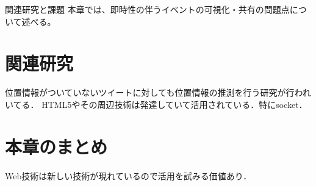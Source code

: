 \chapterhead
{関連研究と課題}
{本章では、即時性の伴うイベントの可視化・共有の問題点について述べる。}

\section{関連研究}
位置情報がついていないツイートに対しても位置情報の推測を行う研究が行われいてる．\cite{inproceedings4}
HTML5やその周辺技術は発達していて活用されている\cite{inproceedings1}．特にsocket\cite{inproceedings3}．

\section{本章のまとめ}
Web技術は新しい技術が現れているので活用を試みる価値あり．
